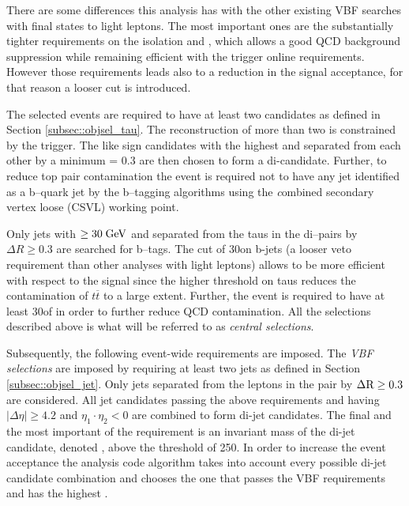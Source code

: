 There are some differences this analysis has with the other existing VBF searches with final states to light leptons. The most important ones are the substantially tighter requirements on the \hadtau isolation and \pt, which allows a good QCD background suppression while remaining efficient with the trigger online requirements. However those requirements leads also to a reduction in the signal acceptance, for that reason a looser \met cut is introduced.

The selected events are required to have at least two \hadtau candidates as defined in Section \ref{subsec::objsel_tau}. The reconstruction of more than two \hadtau is constrained by the trigger. The like sign \hadtau candidates with the highest \pt and separated from each other by a minimum \deltar = 0.3 are then chosen to form a di-\hadtau candidate. 
Further, to reduce top pair contamination the event is required not to have any jet identified as a b--quark jet by the b--tagging algorithms using the {\textit combined secondary vertex loose} (CSVL) working point. 

Only jets with \pt $\ge 30\;\text{Ge}\kern-0.06667em\text{V}$ and separated from the taus in the di--\hadtau pairs by $\Delta R \ge 0.3$ are searched for b--tags. The \pt cut of 30\gev on b-jets (a looser veto requirement than other analyses with light leptons) allows to be more efficient with respect to the signal since the higher \pt threshold on taus reduces the contamination of $t\overline{t}$ to a large extent. Further, the event is required to have at least 30\gev of \met in order to further reduce QCD contamination. All the selections described above is what will be referred to as \textit{central selections}.

Subsequently, the following event-wide requirements are imposed. The {\textit {VBF selections}} are imposed by requiring at least two jets as defined in Section \ref{subsec::objsel_jet}. Only jets separated from the leptons in the \hadtau\hadtau pair by $\Delta \text{R} \ge 0.3$ are considered. All jet candidates passing the above requirements and having $\vert \Delta\eta \vert \ge 4.2$ and $\eta_{1}\cdot\eta_{2} < 0$ are combined to form di-jet candidates. The final and the most important of the requirement is an invariant mass of the di-jet candidate, denoted \mjj, above the threshold of 250\gev. In order to increase the event acceptance the analysis code algorithm takes into account every possible di-jet candidate combination and chooses the one that passes the VBF requirements and has the highest \mjj. 

